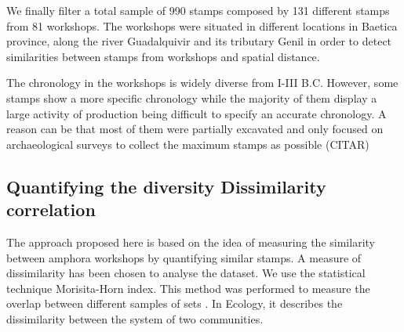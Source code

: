 \documentclass[review]{elsarticle}
\begin{document}
We finally filter a total sample of 990 stamps composed by 131 different stamps from 81 workshops. The workshops were situated in different locations in Baetica province, along the river Guadalquivir and its tributary Genil in order to detect similarities between stamps from workshops and spatial distance. 

The chronology in the workshops is widely diverse from I-III B.C. However, some stamps show a more specific chronology while the majority of them display a large activity of production being difficult to specify an accurate chronology. A reason can be that most of them were partially excavated and only focused on archaeological surveys to collect the maximum stamps as possible (CITAR) 



\subsection{Quantifying the diversity Dissimilarity correlation}


The approach proposed here is based on the idea of measuring the similarity between amphora workshops by quantifying similar stamps. A measure of dissimilarity has been chosen to analyse the dataset. We use the statistical technique Morisita-Horn index. This method was performed to measure the overlap between different samples of sets \citep{morisita_measuring_1959, horn_measurement_1966}. In Ecology, it describes the dissimilarity between the system of two communities. 
\end{document}
